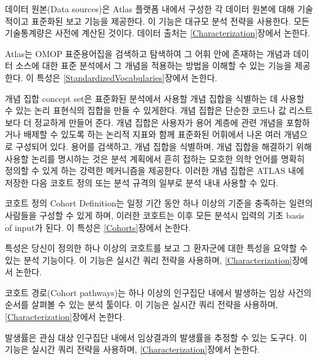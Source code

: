 \documentclass[11pt]{book}
\providecommand{\tightlist}{%
  \setlength{\itemsep}{0pt}\setlength{\parskip}{0pt}}
\theoremstyle{definition}
\theoremstyle{definition}
\theoremstyle{definition}
\theoremstyle{remark}
\begin{document}
\begin{description}
\tightlist
\item[Data Sources \index{ATLAS!Data Sources}
\index{Achilles|see {ATLAS!data sources}}]
데이터 원본(Data sources)은 Atlas 플랫폼 내에서 구성한 각 데이터 원본에
대해 기술적이고 표준화된 보고 기능을 제공한다. 이 기능은 대규모 분석
전략을 사용한다. 모든 기술통계량은 사전에 계산된 것이다. 데이터 출처는
\ref{Characterization}장에서 논한다.
\item[Vocabulary Search \index{ATLAS!vocabulary search}]
Atlas는 OMOP 표준용어집을 검색하고 탐색하여 그 어휘 안에 존재하는 개념과
데이터 소스에 대한 표준 분석에서 그 개념을 적용하는 방법을 이해할 수
있는 기능을 제공한다. 이 특성은 \ref{StandardizedVocabularies}장에서
논한다.
\item[Concept Sets \index{ATLAS!concept sets}]
개념 집합 concept set은 표준화된 분석에서 사용할 개념 집합을 식별하는 데
사용할 수 있는 논리 표현식의 집합을 만들 수 있게한다. 개념 집합은 단순한
코드나 값 리스트보다 더 정교하게 만들어 준다. 개념 집합은 사용자가 용어
계층에 관련 개념을 포함하거나 배제할 수 있도록 하는 논리적 지표와 함께
표준화된 어휘에서 나온 여러 개념으로 구성되어 있다. 용어를 검색하고,
개념 집합을 식별하며, 개념 집합을 해결하기 위해 사용할 논리를 명시하는
것은 분석 계획에서 흔히 접하는 모호한 의학 언어를 명확히 정의할 수 있게
하는 강력한 메커니즘을 제공한다. 이러한 개념 집합은 ATLAS 내에 저장한
다음 코호트 정의 또는 분석 규격의 일부로 분석 내내 사용할 수 있다.
\item[Cohort Definitions \index{ATLAS!cohort definitions}]
코호트 정의 Cohort Definition는 일정 기간 동안 하나 이상의 기준을
충족하는 일련의 사람들을 구성할 수 있게 하며, 이러한 코호트는 이후 모든
분석시 입력의 기초 basis of input가 된다. 이 특성은 \ref{Cohorts}장에서
논한다.
\item[Characterizations \index{ATLAS!cohort characterization}]
특성은 당신이 정의한 하나 이상의 코호트를 보고 그 환자군에 대한 특성을
요약할 수 있는 분석 기능이다. 이 기능은 실시간 쿼리 전략을 사용하며,
\ref{Characterization}장에서 논한다.
\item[Cohort Pathways \index{ATLAS!cohort pathways}]
코호트 경로(Cohort pathways)는 하나 이상의 인구집단 내에서 발생하는 임상
사건의 순서를 살펴볼 수 있는 분석 툴이다. 이 기능은 실시간 쿼리 전략을
사용하며, \ref{Characterization}장에서 논한다.
\item[Incidence Rates \index{ATLAS!incidence rates}]
발생률은 관심 대상 인구집단 내에서 임상결과의 발생률을 추정할 수 있는
도구다. 이 기능은 실시간 쿼리 전략을 사용하며,
\ref{Characterization}장에서 논한다.

\end{description}
\end{document}
